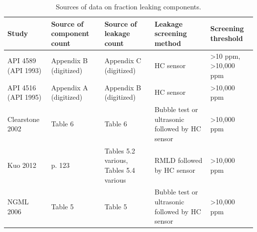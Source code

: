 \documentclass[11pt]{report}
\begin{document}
\begin{landscape}


\begin{table}[]
\begin{scriptsize}
\caption{Sources of data on fraction leaking components.}
\label{tab:fraction_leaking_sources}
\begin{tabular*}{1\columnwidth}{lllll}
\toprule
Study               & Source of component count & Source of leakage count                & Leakage screening method                        & Screening threshold                        \\
\midrule
API 4589 (API 1993) & Appendix B (digitized)    & Appendix C (digitized)                 & HC sensor                                       & \textgreater{}10 ppm, \textgreater 10,000 ppm \\
API 4516 (API 1995) & Appendix A (digitized)    & Appendix B (digitized)                 & HC sensor                                       & \textgreater 10,000 ppm                       \\
Clearstone 2002     & Table 6                   & Table 6                                & Bubble test or ultrasonic followed by HC sensor & \textgreater{}10,000 ppm                      \\
Kuo 2012            & p. 123                    & Tables 5.2 various, Tables 5.4 various & RMLD followed by HC sensor                      & \textgreater{}10,000 ppm                      \\
NGML 2006           & Table 5                   & Table 5                                & Bubble test or ultrasonic followed by HC sensor & \textgreater{}10,000 ppm      \\
\bottomrule               
\end{tabular*}
\end{scriptsize}
\end{table}



\end{landscape}
\end{document}
